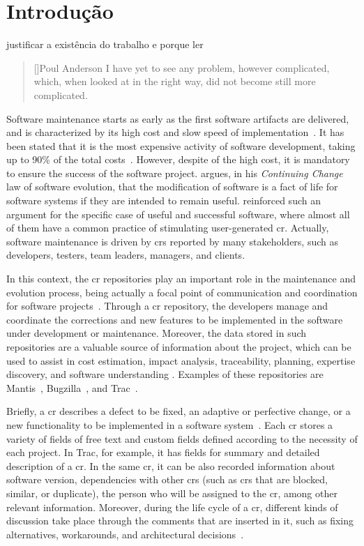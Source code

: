 \chapter{Introdução}
\label{chp:introduction}

justificar a existência do trabalho e porque ler

\begin{quotation}[]{Poul Anderson}
I have yet to see any problem, however complicated, which, when looked at in the
right way, did not become still more complicated.
\end{quotation}

Software maintenance starts as early as the first software artifacts are
delivered, and is characterized by its high cost and slow speed of
implementation~\citep{swebok2004}. It has been stated that it is the most
expensive activity of software development, taking up to 90\% of the total
costs~\citep{Eastwood1993,Erlikh2000}. However, despite of the high cost, it is
mandatory to ensure the success of the software project. \citet{Lehman1980}
argues, in his \emph{Continuing Change} law of software evolution, that the
modification of software is a fact of life for software systems if they are
intended to remain useful. \citet{Bennett2000} reinforced such an argument for
the specific case of useful and successful software, where almost all of them
have a common practice of stimulating user-generated \ac{cr}. Actually, software
maintenance is driven by \acp{cr} reported by many stakeholders, such as
developers, testers, team leaders, managers, and clients.

In this context, the \ac{cr} repositories play an important role in the
maintenance and evolution process, being actually a focal point of communication
and coordination for software projects~\citep{Bertram2010}. Through a \ac{cr}
repository, the developers manage and coordinate the corrections and new
features to be implemented in the software under development or maintenance.
Moreover, the data stored in such repositories are a valuable source of
information about the project, which can be used to assist in cost estimation,
impact analysis, traceability, planning, expertise discovery, and software
understanding \citep{CavalcantiSQJ2011}. Examples of these repositories are
Mantis~\citep{Mantis}, Bugzilla~\citep{Bugzilla}, and Trac~\citep{Trac}.

Briefly, a \ac{cr} describes a defect to be fixed, an adaptive or perfective
change, or a new functionality to be implemented in a software
system~\citep{CavalcantiSQJ2011}. Each \ac{cr} stores a variety of fields of
free text and custom fields defined according to the necessity of each project.
In Trac, for example, it has fields for summary and detailed description of a
\ac{cr}. In the same \ac{cr}, it can be also recorded information about software
version, dependencies with other \acp{cr} (such as \acp{cr} that are blocked,
similar, or duplicate), the person who will be assigned to the \ac{cr}, among
other relevant information. Moreover, during the life cycle of a \ac{cr},
different kinds of discussion take place through the comments that are inserted
in it, such as fixing alternatives, workarounds, and architectural
decisions~\citep{Bertram2010}.

